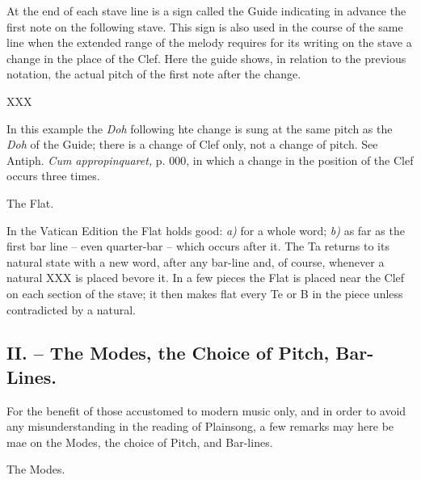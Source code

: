 At the end of each stave line is a sign called the Guide indicating in advance the first note on the following stave. This sign is also used in the course of the same line when the extended range of the melody requires for its writing on the stave a change in the place of the Clef. Here the guide shows, in relation to the previous notation, the actual pitch of the first note after the change.

XXX

In this example the {\it Doh} following hte change is sung at the same pitch as the {\it Doh} of the Guide; there is a change of Clef only, not a change of pitch. See Antiph. {\it Cum appropinquaret,} p. 000, in which a change in the position of the Clef occurs three times.

The Flat.

In the Vatican Edition the Flat holds good: {\it a)} for a whole word; {\it b)} as far as the first bar line -- even quarter-bar -- which occurs after it. The Ta returns to its natural state with a new word, after any bar-line and, of course, whenever a natural XXX is placed bevore it. In a few pieces the Flat is placed near the Clef on each section of the stave; it then makes flat every Te or B in the piece unless contradicted by a natural.

\subsection{II. -- The Modes, the Choice of Pitch, Bar-Lines.}

For the benefit of those accustomed to modern music only, and in order to avoid any misunderstanding in the reading of Plainsong, a few remarks may here be mae on the Modes, the choice of Pitch, and Bar-lines.

The Modes.

